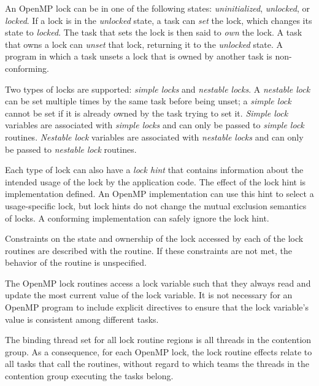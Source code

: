 An OpenMP lock can be in one of the following states: \emph{uninitialized}, \emph{unlocked}, or 
\emph{locked}. If a lock is in the \emph{unlocked} state, a task can \emph{set} the lock, which changes its state 
to \emph{locked}. The task that sets the lock is then said to \emph{own} the lock. A task that owns a 
lock can \emph{unset} that lock, returning it to the \emph{unlocked} state. A program in which a task 
unsets a lock that is owned by another task is non-conforming.

Two types of locks are supported: \emph{simple locks} and \emph{nestable locks}. A \emph{nestable lock} can 
be set multiple times by the same task before being unset; a \emph{simple lock} cannot be set if 
it is already owned by the task trying to set it. \emph{Simple lock} variables are associated with 
\emph{simple locks} and can only be passed to \emph{simple lock} routines. \emph{Nestable lock} variables are 
associated with \emph{nestable locks} and can only be passed to \emph{nestable lock} routines.

Each type of lock can also have a \emph{lock hint} that contains information about the intended usage 
of the lock by the application code.  The effect of the lock hint is
implementation defined.  An OpenMP implementation can use this hint to select a
usage-specific lock, but lock hints do not change the mutual exclusion semantics of locks. 
A conforming implementation can safely ignore the lock hint.

Constraints on the state and ownership of the lock accessed by each of the lock routines 
are described with the routine. If these constraints are not met, the behavior of the 
routine is unspecified. 

The OpenMP lock routines access a lock variable such that they always read 
and update the most current value of the lock variable. It is not necessary for an 
OpenMP program to include explicit  directives to ensure that the lock variable's 
value is consistent among different tasks. 

\vspace{-8pt}

\binding
The binding thread set for all lock routine regions is all threads in the contention group. 
As a consequence, for each OpenMP lock, the lock routine effects relate to all tasks that 
call the routines, without regard to which teams the threads in the contention group 
executing the tasks belong.


\vspace{-8pt}

